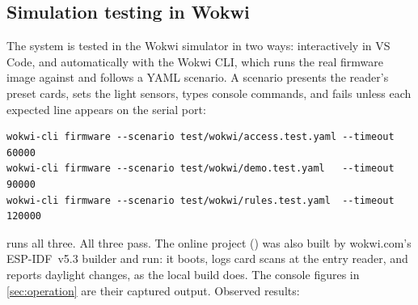 \subsection{Simulation testing in Wokwi}
The system is tested in the Wokwi simulator in two ways: interactively in VS Code, and
automatically with the Wokwi CLI, which runs the real firmware image against
 and follows a YAML scenario. A scenario presents the reader's
preset cards, sets the light sensors, types console commands, and fails unless each expected
line appears on the serial port:
\begin{lstlisting}[style=console]
wokwi-cli firmware --scenario test/wokwi/access.test.yaml --timeout 60000
wokwi-cli firmware --scenario test/wokwi/demo.test.yaml   --timeout 90000
wokwi-cli firmware --scenario test/wokwi/rules.test.yaml  --timeout 120000
\end{lstlisting}
 runs all three. All three pass. The online project (\wokwilink) was also
built by wokwi.com's ESP-IDF~v5.3 builder and run: it boots, logs card scans at the entry reader,
and reports daylight changes, as the local build does. The console figures in \cref{sec:operation} are their captured output.
Observed results:

